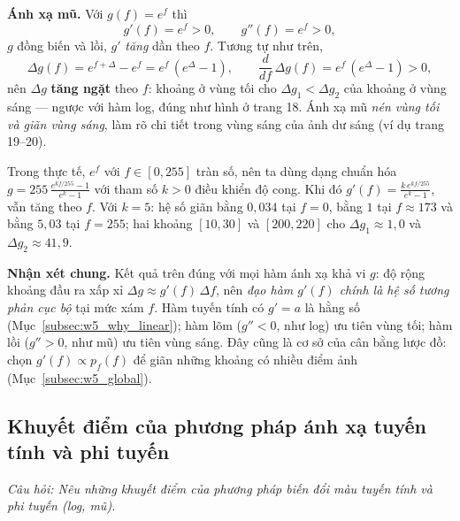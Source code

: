 \textbf{Ánh xạ mũ.} Với $g(f) = e^{f}$ thì
\begin{equation}
g'(f) = e^{f} > 0, \qquad g''(f) = e^{f} > 0,
\end{equation}
$g$ đồng biến và lồi, $g'$ \emph{tăng} dần theo $f$. Tương tự như trên,
\begin{equation}
\Delta g(f) = e^{f + \Delta} - e^{f} = e^{f}\,(e^{\Delta} - 1), \qquad \frac{d}{df}\,\Delta g(f) = e^{f}\,(e^{\Delta} - 1) > 0,
\end{equation}
nên $\Delta g$ \textbf{tăng ngặt} theo $f$: khoảng ở vùng tối cho $\Delta g_1 < \Delta g_2$ của khoảng ở vùng sáng — ngược với hàm log, đúng như hình ở trang 18. Ánh xạ mũ \emph{nén vùng tối và giãn vùng sáng}, làm rõ chi tiết trong vùng sáng của ảnh dư sáng (ví dụ trang 19--20).

Trong thực tế, $e^{f}$ với $f \in [0, 255]$ tràn số, nên ta dùng dạng chuẩn hóa $g = 255\,\frac{e^{k f / 255} - 1}{e^{k} - 1}$ với tham số $k > 0$ điều khiển độ cong. Khi đó $g'(f) = \frac{k\,e^{k f / 255}}{e^k - 1}$, vẫn tăng theo $f$. Với $k = 5$: hệ số giãn bằng $0{,}034$ tại $f = 0$, bằng $1$ tại $f \approx 173$ và bằng $5{,}03$ tại $f = 255$; hai khoảng $[10, 30]$ và $[200, 220]$ cho $\Delta g_1 \approx 1{,}0$ và $\Delta g_2 \approx 41{,}9$.

\textbf{Nhận xét chung.} Kết quả trên đúng với mọi hàm ánh xạ khả vi $g$: độ rộng khoảng đầu ra xấp xỉ $\Delta g \approx g'(f)\,\Delta f$, nên \emph{đạo hàm $g'(f)$ chính là hệ số tương phản cục bộ} tại mức xám $f$. Hàm tuyến tính có $g' = a$ là hằng số (Mục~\ref{subsec:w5_why_linear}); hàm lõm ($g'' < 0$, như log) ưu tiên vùng tối; hàm lồi ($g'' > 0$, như mũ) ưu tiên vùng sáng. Đây cũng là cơ sở của cân bằng lược đồ: chọn $g'(f) \propto p_f(f)$ để giãn những khoảng có nhiều điểm ảnh (Mục~\ref{subsec:w5_global}).

\subsection{Khuyết điểm của phương pháp ánh xạ tuyến tính và phi tuyến}
\label{subsec:w5_drawbacks}

\textit{Câu hỏi: Nêu những khuyết điểm của phương pháp biến đổi màu tuyến tính và phi tuyến (log, mũ).}

